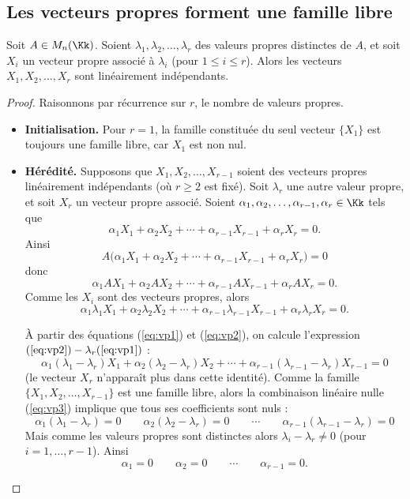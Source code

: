 \documentclass[11pt, class=report,crop=false]{standalone}
\begin{document}
\subsection{Les vecteurs propres forment une famille libre}

\begin{theoreme}
\label{th:vplibre}
Soit $A \in M_n(\Kk)$.
Soient $\lambda_1,\lambda_2,\dots,\lambda_r$ des valeurs propres distinctes de 
$A$, et soit $X_i$ un vecteur propre associé à $\lambda_i$ (pour $1\leq i\leq r$).
Alors les vecteurs $X_1,X_2,\dots,X_r$ sont linéairement indépendants.
\end{theoreme}



\begin{proof}
Raisonnons par récurrence sur $r$, le nombre de valeurs propres.

\begin{itemize}
  \item \textbf{Initialisation.}
    Pour $r=1$, la famille constituée du seul vecteur $\{X_1\}$ est toujours une famille libre, car $X_1$ est non nul.
  
  
  \item \textbf{Hérédité.}
    Supposons que $X_1,X_2,\dots,X_{r-1}$ soient des vecteurs propres linéairement indépendants (où $r\ge 2$ est fixé). Soit $\lambda_r$ une autre valeur propre, et soit $X_r$ un vecteur propre associé. 
  Soient $\alpha_1,\alpha_2,\ldots,\alpha_{r-1}, \alpha_r \in \Kk$ tels que
\begin{equation}
\label{eq:vp1}
\alpha_1 X_1 + \alpha_2 X_2 +\cdots + \alpha_{r-1} X_{r-1} + \alpha_r X_r = 0.
\end{equation}
Ainsi
$$A \big(\alpha_1 X_1 + \alpha_2 X_2 +\cdots + \alpha_{r-1} X_{r-1} + \alpha_r X_r \big) = 0 $$
donc
$$\alpha_1 A X_1 + \alpha_2 A X_2 +\cdots + \alpha_{r-1} A X_{r-1} + \alpha_r A X_r  = 0.$$
Comme les $X_i$ sont des vecteurs propres, alors
\begin{equation}
\label{eq:vp2}
\alpha_1 \lambda_1 X_1 + \alpha_2 \lambda_2 X_2 +\cdots + \alpha_{r-1} \lambda_{r-1} X_{r-1} + \alpha_r \lambda_r X_r  = 0.
\end{equation}

\`A partir des équations (\ref{eq:vp1}) et (\ref{eq:vp2}), on calcule
l'expression $(\ref{eq:vp2}) - \lambda_r (\ref{eq:vp1})$ :
\begin{equation}
\label{eq:vp3}
\alpha_1 (\lambda_1-\lambda_r)  X_1 + \alpha_2 (\lambda_2-\lambda_r) X_2 +\cdots + \alpha_{r-1} (\lambda_{r-1}-\lambda_{r}) X_{r-1} = 0
\end{equation}
(le vecteur $X_r$ n'apparaît plus dans cette identité).
Comme la famille $\{ X_1,X_2,\dots,X_{r-1}\}$ est une famille libre, alors la combinaison linéaire nulle (\ref{eq:vp3}) implique que tous ses coefficients sont nuls :
$$\alpha_1 (\lambda_1-\lambda_r) = 0 \qquad \alpha_2 (\lambda_2-\lambda_r) = 0 \qquad 
\cdots \qquad \alpha_{r-1} (\lambda_{r-1}-\lambda_{r}) = 0$$
Mais comme les valeurs propres sont distinctes alors $\lambda_i - \lambda_r \neq 0$ (pour $i=1,\ldots,r-1$).
Ainsi 
$$\alpha_1  = 0 \qquad \alpha_2 = 0 \qquad 
\cdots \qquad \alpha_{r-1} =0.$$


\end{itemize}
\end{proof}
\end{document}
